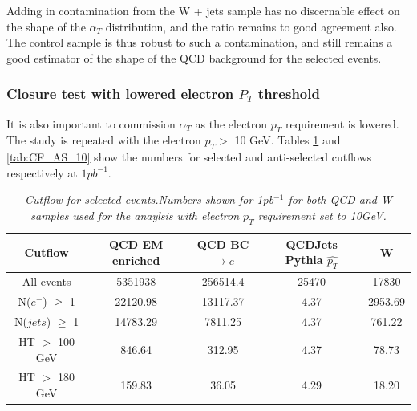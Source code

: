 Adding in contamination from the W + jets sample has no discernable effect on the shape of the $\alpha_{T}$ distribution, and the ratio remains to good agreement also. The control sample is thus robust to such a contamination, and still remains a good estimator of the shape of the QCD background for the selected events.

\subsubsection{Closure test with lowered electron $P_{T}$ threshold}
It is also important to commission $\alpha_{T}$ as the electron $p_{T}$ requirement is lowered. The study is repeated with the electron $p_{T} >$ 10 GeV. Tables \ref{tab:CF_S_10} and \ref{tab:CF_AS_10} show the numbers for selected and anti-selected cutflows respectively at $1pb^{-1}$. 

\begin{table}[h!]
\begin{center}
\begin{tabular}{|c||c|c|c|c|}
\hline
Cutflow & QCD EM enriched & QCD BC$\rightarrow e$ & QCDJets Pythia $\hat{p_{T}}$ &  W \\
\hline
All events & 5351938 & 256514.4 & 25470 & 17830 \\

N($e^{-}$) $\geq$ 1 & 22120.98 & 13117.37 & 4.37 & 2953.69\\

N($jets$) $\geq$ 1 & 14783.29 & 7811.25 & 4.37 & 761.22\\

HT $>$ 100 GeV & 846.64 & 312.95 & 4.37 & 78.73\\

HT $>$ 180 GeV & 159.83& 36.05 & 4.29 & 18.20\\
\hline
\end{tabular}
\end{center}
\caption{\textit{Cutflow for selected events.Numbers shown for 1pb$^{-1}$ for both QCD and W samples used for the anaylsis with electron $p_{T}$ requirement set to 10GeV.}}
\label{tab:CF_S_10}
\end{table}

